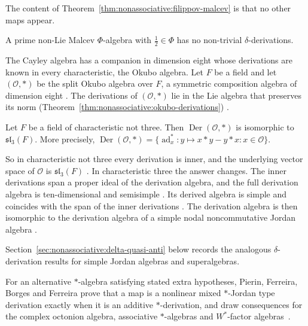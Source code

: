 The content of Theorem~\ref{thm:nonassociative:filippov-malcev} is that no other maps appear. %

\begin{theorem}
\label{thm:nonassociative:filippov-malcev}
A prime non-Lie Malcev $\Phi$-algebra with $\tfrac{1}{2}\in\Phi$ has no
non-trivial $\delta$-derivations.
\end{theorem}

The Cayley algebra has a companion in dimension eight whose derivations are
known in every characteristic, the Okubo algebra. Let $F$ be a field and let
$(\mathcal{O},*)$ be the split Okubo algebra over $F$, a symmetric composition
algebra of dimension eight \cite[p.~4]{Elduque2015}. The derivations of
$(\mathcal{O},*)$ lie in the Lie algebra that preserves its norm (Theorem~\ref{thm:nonassociative:okubo-derivations})
\cite[p.~5]{Elduque2015}.\begin{theorem}\label{thm:nonassociative:okubo-derivations}
Let $F$ be a field of characteristic not three. Then
$\operatorname{Der}(\mathcal{O},*)$ is isomorphic to $\mathfrak{sl}_3(F)$.
More precisely,
$\operatorname{Der}(\mathcal{O},*)=\{\operatorname{ad}^{*}_x\colon y\mapsto
x*y-y*x : x\in\mathcal{O}\}$.
\end{theorem}

So in characteristic not three every derivation is inner, and the underlying
vector space of $\mathcal{O}$ is $\mathfrak{sl}_3(F)$
\cite[p.~5]{Elduque2015}. In characteristic three the answer changes. The inner
derivations span a proper ideal of the derivation algebra, and the full
derivation algebra is ten-dimensional and semisimple
\cite[Theorem~9, p.~6]{Elduque2015}. Its derived algebra is simple and coincides
with the span of the inner derivations \cite[Theorem~9, p.~6]{Elduque2015}. The
derivation algebra is then isomorphic to the derivation algebra of a simple
nodal noncommutative Jordan algebra \cite[Theorem~9, p.~6]{Elduque2015}.

Section~\ref{sec:nonassociative:delta-quasi-anti} below records the
analogous $\delta$-derivation results for simple Jordan algebras and
superalgebras.

For an alternative $*$-algebra satisfying stated extra hypotheses, Pierin, Ferreira, Borges and Ferreira prove that a map is a nonlinear mixed $*$-Jordan type derivation exactly when it is an additive $*$-derivation, and draw consequences for the complex octonion algebra, associative $*$-algebras and $W^*$-factor algebras~\cite{WlAboutTheAdditivityOfANonlinear2025}.

